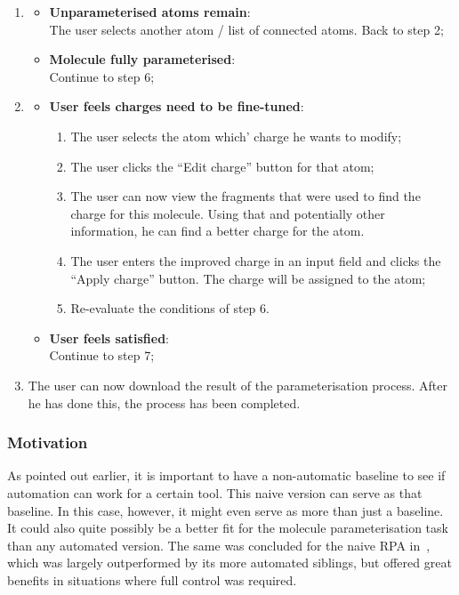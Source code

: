 \begin{enumerate}[itemsep=.1em, parsep=.2em, topsep=0em]
\item
  \begin{itemize}[leftmargin=0cm, itemsep=.1em, parsep=.1em]
  \item[]{\bf Unparameterised atoms remain}:\\The user selects another atom / list of connected atoms. Back to step 2;
  \item[] {\bf Molecule fully parameterised}:\\Continue to step 6;
  \end{itemize}
\item
  \begin{itemize}[leftmargin=0cm, itemsep=.1em, parsep=.1em]
  \item[] {\bf User feels charges need to be fine-tuned}:
    \begin{enumerate}
    \item The user selects the atom which' charge he wants to modify;
    \item The user clicks the ``Edit charge'' button for that atom;
    \item The user can now view the fragments that were used to find the charge for this molecule. Using that and potentially other information, he can find a better charge for the atom.
    \item The user enters the improved charge in an input field and clicks the ``Apply charge'' button. The charge will be assigned to the atom;
    \item Re-evaluate the conditions of step 6.
    \end{enumerate}
  \item[]{\bf User feels satisfied}:\\Continue to step 7;
  \end{itemize}
\item The user can now download the result of the parameterisation process. After he has done this, the process has been completed.
\end{enumerate}

\subsubsection{Motivation}
As pointed out earlier, it is important to have a non-automatic baseline to see if automation can work for a certain tool. This naive version can serve as that baseline. In this case, however, it might even serve as more than just a baseline. It could also quite possibly be a better fit for the molecule parameterisation task than any automated version. The same was concluded for the naive RPA in~\cite{payne2000varying}, which was largely outperformed by its more automated siblings, but offered great benefits in situations where full control was required.

